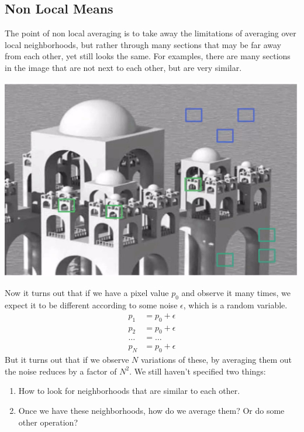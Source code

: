 \documentclass{article}
\begin{document}
  \subsection{Non Local Means}

    The point of non local averaging is to take away the limitations of averaging over local neighborhoods, but rather through many sections that may be far away from each other, yet still looks the same. For examples, there are many sections in the image that are not next to each other, but are very similar. 
    \begin{center}
        \includegraphics[scale=0.2]{img/nonlocal_average.png}
    \end{center}
    Now it turns out that if we have a pixel value $p_0$ and observe it many times, we expect it to be different according to some noise $\epsilon$, which is a random variable. 
    \begin{align*}
        p_1 & = p_0 + \epsilon \\ 
        p_2 & = p_0 + \epsilon \\ 
        \ldots & = \ldots \\ 
        p_N & = p_0 + \epsilon
    \end{align*}
    But it turns out that if we observe $N$ variations of these, by averaging them out the noise reduces by a factor of $N^2$. We still haven't specified two things: 
    \begin{enumerate}
        \item How to look for neighborhoods that are similar to each other. 
        \item Once we have these neighborhoods, how do we average them? Or do some other operation? 
    \end{enumerate}
\end{document}
